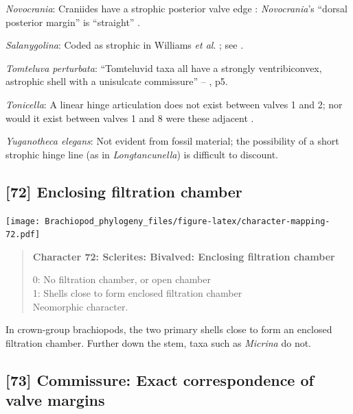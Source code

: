 \documentclass[openany]{book}
\begin{document}
\hypertarget{Novocrania-coding-71}{}
\emph{Novocrania}: Craniides have a strophic posterior valve edge
\citep[table 39 on p.~2853]{Williams2007Supplement}: \emph{Novocrania}'s
``dorsal posterior margin'' is ``straight''
\citep[p.~171]{Williams2000LinguliformeaCraniiformea}.

\hypertarget{Salanygolina-coding-71}{}
\emph{Salanygolina}: Coded as strophic in Williams \emph{et al}.
\citeyearpar{Williams1998Thediversity}; see
\citet{Holmer2009Theenigmatic}.

\hypertarget{Tomteluva_perturbata-coding-71}{}
\emph{Tomteluva perturbata}: ``Tomteluvid taxa all have a strongly
ventribiconvex, astrophic shell with a unisulcate commissure'' --
\citet{Streng2016Anew}, p5.

\hypertarget{Tonicella-coding-71}{}
\emph{Tonicella}: A linear hinge articulation does not exist between
valves 1 and 2; nor would it exist between valves 1 and 8 were these
adjacent \citep{Connors2012}.

\hypertarget{Yuganotheca_elegans-coding-71}{}
\emph{Yuganotheca elegans}: Not evident from fossil material; the
possibility of a short strophic hinge line (as in \emph{Longtancunella})
is difficult to discount.

\subsection*{{[}72{]} Enclosing filtration
chamber}\label{enclosing-filtration-chamber}

\texttt{[image: Brachiopod\_phylogeny\_files/figure-latex/character-mapping-72.pdf]}

\begin{quote}
\textbf{Character 72: Sclerites: Bivalved: Enclosing filtration chamber}

0: No filtration chamber, or open chamber\\
1: Shells close to form enclosed filtration chamber\\
Neomorphic character.
\end{quote}

In crown-group brachiopods, the two primary shells close to form an
enclosed filtration chamber. Further down the stem, taxa such as
\emph{Micrina} do not.

\subsection*{{[}73{]} Commissure: Exact correspondence of valve
margins}\label{commissure-exact-correspondence-of-valve-margins}
\end{document}
